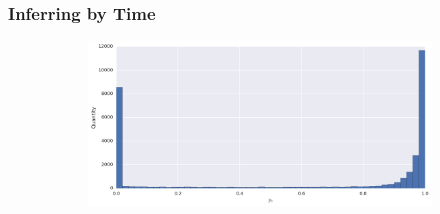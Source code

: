 \subsubsection{Inferring by Time}

\begin{figure}[h]
\centering
\begin{subfigure}[t]{\textwidth}
	\includegraphics[width=\textwidth]{figures/bayes/hist_time.png}
\end{subfigure}


\end{figure}
